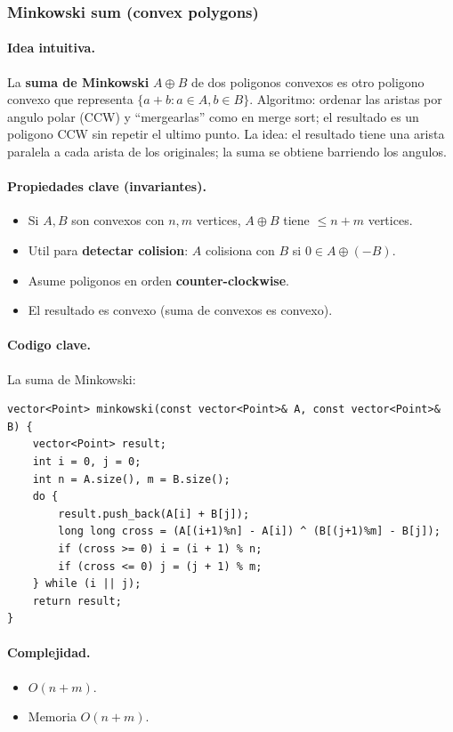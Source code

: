 ﻿\subsubsection{Minkowski sum (convex polygons)}

\paragraph{Idea intuitiva.}
La \textbf{suma de Minkowski} $A \oplus B$ de dos poligonos convexos es otro poligono convexo que representa $\{a + b : a \in A, b \in B\}$. Algoritmo: ordenar las aristas por angulo polar (CCW) y ``mergearlas'' como en merge sort; el resultado es un poligono CCW sin repetir el ultimo punto. La idea: el resultado tiene una arista paralela a cada arista de los originales; la suma se obtiene barriendo los angulos.

\paragraph{Propiedades clave (invariantes).}
\begin{itemize}\setlength\itemsep{0pt}
	\item Si $A, B$ son convexos con $n, m$ vertices, $A \oplus B$ tiene $\le n + m$ vertices.
	\item Util para \textbf{detectar colision}: $A$ colisiona con $B$ si $0 \in A \oplus (-B)$.
	\item Asume poligonos en orden \textbf{counter-clockwise}.
	\item El resultado es convexo (suma de convexos es convexo).
\end{itemize}

\paragraph{Codigo clave.}
La suma de Minkowski:
\begin{verbatim}
vector<Point> minkowski(const vector<Point>& A, const vector<Point>& B) {
    vector<Point> result;
    int i = 0, j = 0;
    int n = A.size(), m = B.size();
    do {
        result.push_back(A[i] + B[j]);
        long long cross = (A[(i+1)%n] - A[i]) ^ (B[(j+1)%m] - B[j]);
        if (cross >= 0) i = (i + 1) % n;
        if (cross <= 0) j = (j + 1) % m;
    } while (i || j);
    return result;
}
\end{verbatim}

\paragraph{Complejidad.}
\begin{itemize}\setlength\itemsep{0pt}
	\item $O(n + m)$.
	\item Memoria $O(n + m)$.
\end{itemize}

